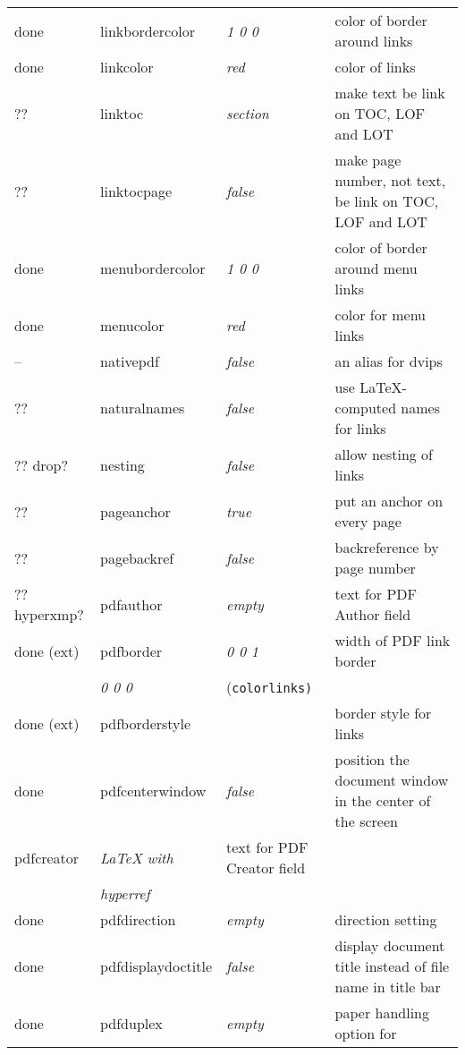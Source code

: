 \begin{longtable}{@{}l>{\ttfamily}llp{7cm}@{}}
done & linkbordercolor    & \textit{1 0 0}         & color of border around links \\
done & linkcolor          & \textit{red}           & color of links \\
??   &linktoc            & \textit{section}       & make text be link on TOC, LOF and LOT \\
?? & linktocpage        & \textit{false}         & make page number, not text, be link on TOC, LOF and LOT \\
done & menubordercolor    & \textit{1 0 0}         & color of border around menu links \\
done & menucolor          & \textit{red}           & color for menu links \\
-- & nativepdf          & \textit{false}         & an alias for \textsf{dvips} \\
?? & naturalnames       & \textit{false}         & use \LaTeX-computed names for links \\
?? drop? & nesting            & \textit{false}         & allow nesting of links \\
?? & pageanchor         & \textit{true}          & put an anchor on every page \\
?? & pagebackref        & \textit{false}         & backreference by page number \\
?? hyperxmp? & pdfauthor          & \textit{empty}         & text for PDF Author field \\
done (ext) & pdfborder          & \textit{0 0 1}         & width of PDF link border \\
                   & \textit{0 0 0}         & (\texttt{colorlinks)} \\
done (ext) & pdfborderstyle     &                        & border style for links \\
done & pdfcenterwindow    & \textit{false}         & position the document window in the center of the screen \\
pdfcreator         & \textit{LaTeX with}    & text for PDF Creator field \\
                   & \textit{hyperref}      & \\
done &pdfdirection       & \textit{empty}         & direction setting \\
done &pdfdisplaydoctitle & \textit{false}         & display document title instead
                                              of file name in title bar\\
done &pdfduplex          & \textit{empty}         & paper handling option for

\end{longtable}
